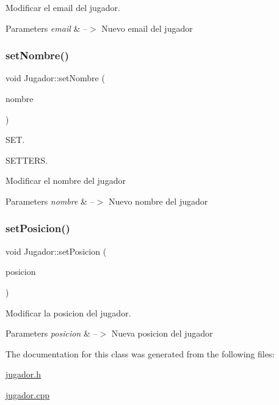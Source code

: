 Modificar el email del jugador. 


\begin{DoxyParams}{Parameters}
{\em email} & --$>$ Nuevo email del jugador \\
\hline
\end{DoxyParams}
\mbox{\label{classJugador_a66ae18a593fe618962a7c78fa201712a}} 
\subsubsection{\texorpdfstring{set\+Nombre()}{setNombre()}}
{\footnotesize\ttfamily void Jugador\+::set\+Nombre (\begin{DoxyParamCaption}\item[{Q\+String}]{nombre }\end{DoxyParamCaption})}



S\+ET. 

S\+E\+T\+T\+E\+RS.

Modificar el nombre del jugador 
\begin{DoxyParams}{Parameters}
{\em nombre} & --$>$ Nuevo nombre del jugador \\
\hline
\end{DoxyParams}
\mbox{\label{classJugador_a0b56f6473a446c7dd2c649dfc2d7cdea}} 
\subsubsection{\texorpdfstring{set\+Posicion()}{setPosicion()}}
{\footnotesize\ttfamily void Jugador\+::set\+Posicion (\begin{DoxyParamCaption}\item[{int}]{posicion }\end{DoxyParamCaption})}



Modificar la posicion del jugador. 


\begin{DoxyParams}{Parameters}
{\em posicion} & --$>$ Nueva posicion del jugador \\
\hline
\end{DoxyParams}


The documentation for this class was generated from the following files\+:\begin{DoxyCompactItemize}
\item 
\mbox{\hyperlink{jugador_8h}{jugador.\+h}}\item 
\mbox{\hyperlink{jugador_8cpp}{jugador.\+cpp}}\end{DoxyCompactItemize}
